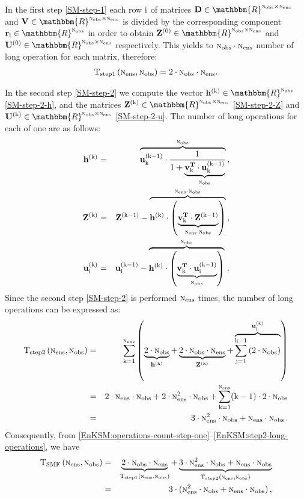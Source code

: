 \documentclass[12pt]{article}
\newcommand{\Nobs}{\textsc{n}_{{\rm obs}}}
\newcommand{\Nens}{\textsc{n}_{{\rm ens}}}
\newcommand{\sZ}[1]{{\bf Z}^{\left(\rm #1 \right)}}
\newcommand{\h}[1]{{\bf h}^{\left( \rm #1\right)}}
\newcommand{\U}[1]{{\bf U}^{\left ( \rm #1 \right)}}
\renewcommand{\u}[2]{{\bf u}_{\rm #1}^{(\rm #2)}}
\newcommand{\D}{{\bf D}}
\newcommand{\V}{{\bf V}}
\renewcommand{\v}[1]{{\bf v}_{{\rm #1}}}
\renewcommand{\Re}{\mathbbm{R}}
\renewcommand{\k}{{\rm k}}
\newcommand{\T}[3]{{\rm T_{\rm #3} \left( #1,#2 \right )}}
\newcommand{\rv}{{\bf r}}
\begin{document}
In the first step \eqref{SM-step-1} each row ${\rm i}$ of matrices $\D \in \Re^{\Nobs \times \Nens}$ and $\V \in \Re^{\Nobs \times \Nens}$ is divided by the corresponding component $\rv_{\rm i} \in \Re^{\Nobs}$ in order to obtain $\sZ{0} \in \Re^{\Nobs \times \Nens}$ and $\U{0} \in \Re^{\Nobs \times \Nens}$ respectively. This yields to $\Nobs \cdot \Nens$ number of long operation for each matrix, therefore:
\begin{eqnarray}
\label{EnKSM:operations-count-step-one}
\displaystyle \T{\Nens}{\Nobs}{step1} = 2 \cdot \Nobs \cdot \Nens.
\end{eqnarray}

In the second step  \eqref{SM-step-2} we compute the vector $\h{\k} \in \Re^{\Nobs}$ \eqref{SM-step-2-h}, and the matrices $\sZ{\k} \in \Re^{\Nobs \times \Nens}$ \eqref{SM-step-2-Z} and $\U{\k} \in \Re^{\Nobs \times \Nens}$ \eqref{SM-step-2-u}. The number of long operations for each of one are as follows:
\begin{eqnarray} \nonumber
\displaystyle
\h{\k} &=& \overbrace{\u{\k}{\k-1} \cdot \frac{1}{1+\underbrace{\v{\k}^{ \bf T} \cdot \u{\k}{\k-1}}_{\Nobs}}}^{\Nobs}\,,  \\ \nonumber
\sZ{\k} &=& \sZ{\k-1} - \overbrace{\h{\k} \cdot \left( \underbrace{\v{\k}^{\bf T} \cdot \sZ{\k-1}}_{\Nens \cdot \Nobs} \right)}^{\Nens \cdot \Nobs}\,, \\ \nonumber
\u{\rm i}{\k} &=& \u{\rm i}{\k-1} - \overbrace{\h{\k} \cdot \left( \underbrace{\v{k}^{\bf T} \cdot \u{\rm i}{\k-1}}_{\Nobs} \right)}^{ \Nobs}\,.
\end{eqnarray}
Since the second step \eqref{SM-step-2} is performed $\Nens$ times, the number of long operations can be expressed as:
\begin{eqnarray} 
 \nonumber
\displaystyle \T{\Nens}{\Nobs}{step2} &=& \sum_{\k = 1}^{\Nens} \left( \underbrace{2 \cdot \Nobs}_{\h{k}}+\underbrace{2 \cdot \Nobs \cdot \Nens}_{\sZ{k}}+\overbrace{\sum_{\rm j = 1}^{\k-1}\left (2 \cdot \Nobs \right)}^{\u{\rm j}{\k}}\right ) \\ \nonumber
&=& 2 \cdot \Nens \cdot \Nobs + 2 \cdot \Nens^2 \cdot \Nobs + \sum_{\rm k = 1}^{\Nens}(\k-1) \cdot 2\cdot \Nobs \\ \label{EnKSM:step2-long-operations}
&=& 3 \cdot \Nens^2 \cdot \Nobs + \Nens \cdot \Nobs\,.
\end{eqnarray}
Consequently, from \eqref{EnKSM:operations-count-step-one}--\eqref{EnKSM:step2-long-operations}, we have
\begin{eqnarray} \nonumber
\T{\Nens}{\Nobs}{SMF} &=& \underbrace{2 \cdot \Nobs \cdot \Nens}_{\T{\Nens}{\Nobs}{step1}} + \underbrace{3 \cdot \Nens^2 \cdot \Nobs + \Nens \cdot \Nobs}_{\T{\Nens}{\Nobs}{step2}} \\ \nonumber
&=&3 \cdot ( \Nens^2 \cdot \Nobs + \Nens \cdot \Nobs)\,,
\end{eqnarray}
\end{document}
